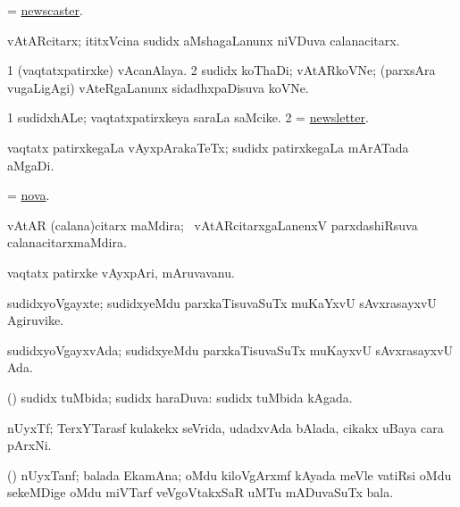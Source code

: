 \bentry
{}
\gl{\nA}
\bmng
= \hyperlink{newscaster}{newscaster}. 
\emng
\eentry

\bentry
{}
\gl{\nA}
\bmng
vAtARcitarx; ititxVcina sudidx aMshagaLanunx niVDuva calanacitarx. 
\emng
\eentry

\bentry
{}
\gl{\nA}
\bmng
\bnum
\num{1} (vaqtatxpatirxke) vAcanAlaya. 
\num{2} sudidx koThaDi; vAtARkoVNe; (parxsAra \mo vugaLigAgi) vAteRgaLanunx sidadhxpaDisuva koVNe. 
\enum
\emng
\eentry

\bentry
{}
\gl{\nA}
\bmng
\bnum
\num{1} sudidxhALe; vaqtatxpatirxkeya saraLa saMcike. 
\num{2} = \hyperlink{newsletter}{newsletter}. 
\enum
\emng
\eentry

\bentry
{}
\gl{\nA}
\bmng
vaqtatx patirxkegaLa vAyxpArakaTeTx; sudidx patirxkegaLa mArATada aMgaDi. 
\emng
\eentry

\bentry
{}
\gl{\nA}
\bmng
= \hyperlink{nova}{nova}. 
\emng
\eentry

\bentry
{}
\gl{\nA}
\bmng
vAtAR (calana)citarx maMdira; \kanmu\ vAtARcitarxgaLanenxV parxdashiRsuva calanacitarxmaMdira. 
\emng
\eentry

\bentry
{}
\gl{\nA}
\bmng
vaqtatx patirxke vAyxpAri, mAruvavanu. 
\emng
\eentry

\bentry
{}
\gl{\nA}
\bmng
sudidxyoVgayxte; sudidxyeMdu parxkaTisuvaSuTx muKaYxvU sAvxrasayxvU Agiruvike. 
\emng
\eentry

\bentry
{}
\gl{\gu}
\bmng
sudidxyoVgayxvAda; sudidxyeMdu parxkaTisuvaSuTx muKayxvU sAvxrasayxvU Ada. 
\emng
\eentry

\bentry
{}
\gl{\gu}
\bmng
(\AmA) sudidx tuMbida; sudidx haraDuva:  sudidx tuMbida kAgada. 
\emng
\eentry

\bentry
{}
\gl{\nA}
\bmng
nUyxTf; TerxYTarasf kulakekx seVrida, udadxvAda bAlada, cikakx uBaya cara pArxNi.  
\emng
\eentry

\bentry
{}
\gl{\nA}
\bmng
(\Bwvi) nUyxTanf; balada EkamAna; oMdu kiloVgArxmf kAyada meVle vatiRsi oMdu sekeMDige oMdu miVTarf veVgoVtakxSaR uMTu mADuvaSuTx bala. 
\emng
\eentry

